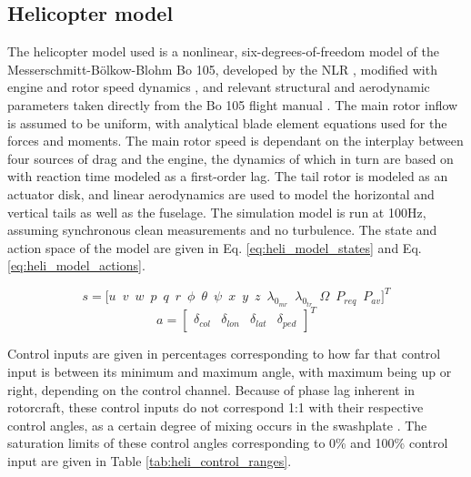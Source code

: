 \subsection{Helicopter model} \label{ssec:helimodel}

The helicopter model used is a nonlinear, six-degrees-of-freedom model of the Messerschmitt-Bölkow-Blohm Bo 105, developed by the NLR \cite{VanDerVorst2001}, modified with engine and rotor speed dynamics \cite{Gille2006}, and relevant structural and aerodynamic parameters taken directly from the Bo 105 flight manual \cite{BO105DataSheet}. The main rotor inflow is assumed to be uniform, with analytical blade element equations used for the forces and moments. The main rotor speed is dependant on the interplay between four sources of drag and the engine, the dynamics of which in turn are based on \cite{book:padfield} with reaction time modeled as a first-order lag. The tail rotor is modeled as an actuator disk, and linear aerodynamics are used to model the horizontal and vertical tails as well as the fuselage. The simulation model is run at 100Hz, assuming synchronous clean measurements and no turbulence. The state and action space of the model are given in Eq. \eqref{eq:heli_model_states} and Eq. \eqref{eq:heli_model_actions}.

\begin{equation} \label{eq:heli_model_states}
    s = \Big[u \enspace v \enspace w \enspace p \enspace q \enspace r \enspace \phi \enspace \theta\enspace \psi\enspace x\enspace y\enspace z\enspace \lambda_{0_{mr}}\enspace \lambda_{0_{tr}}\enspace \Omega \enspace P_{req}\enspace P_{av} \Big]^T
\end{equation}
\begin{equation} \label{eq:heli_model_actions}
    a = \begin{bmatrix} \delta_{col} & \delta_{lon} & \delta_{lat} & \delta_{ped} \end{bmatrix}^T
\end{equation}

Control inputs are given in percentages corresponding to how far that control input is between its minimum and maximum angle, with maximum being up or right, depending on the control channel. Because of phase lag inherent in rotorcraft, these control inputs do not correspond 1:1 with their respective control angles, as a certain degree of mixing occurs in the swashplate \cite{book:padfield}. The saturation limits of these control angles corresponding to 0\% and 100\% control input are given in Table \ref{tab:heli_control_ranges}. 

